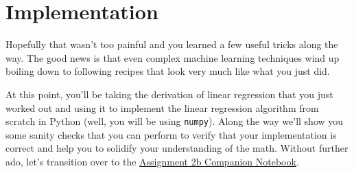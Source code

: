 \documentclass[assignment02_Solutions]{subfiles}
\begin{document}
%
%

\section{Implementation}

Hopefully that wasn't too painful and you learned a few useful tricks along the way.  The good news is that even complex machine learning techniques wind up boiling down to following recipes that look very much like what you just did.

\begin{externalresources}[(90 minutes)]
At this point, you'll be taking the derivation of linear regression that you just worked out and using it to implement the linear regression algorithm from scratch in Python (well, you will be using {\tt numpy}).  Along the way we'll show you some sanity checks that you can perform to verify that your implementation is correct and help you to solidify your understanding of the math. Without further ado, let's transition over to the \href{https://colab.research.google.com/drive/14gBeXCIOkEnL-T-mu4fM4yQJVDy9sw98?usp=sharing}{Assignment 2b Companion Notebook}.
\end{externalresources}


\end{document}
